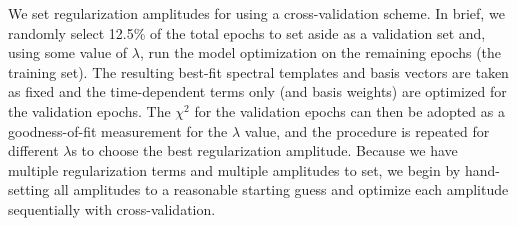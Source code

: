 \documentclass[modern]{aastex62}
\begin{document}
We set regularization amplitudes for \wobble using a cross-validation scheme. 
In brief, we randomly select 12.5\% of the total epochs to set aside as a validation set and, using some value of $\lambda$, run the model optimization on the remaining epochs (the training set).
The resulting best-fit spectral templates and basis vectors are taken as fixed and the time-dependent terms only (\RVs and basis weights) are optimized for the validation epochs. 
The $\chi^2$ for the validation epochs can then be adopted as a goodness-of-fit measurement for the $\lambda$ value, and the procedure is repeated for different $\lambda$s to choose the best regularization amplitude. 
Because we have multiple regularization terms and multiple amplitudes to set, we begin by hand-setting all amplitudes to a reasonable starting guess and optimize each amplitude sequentially with cross-validation.
\end{document}
